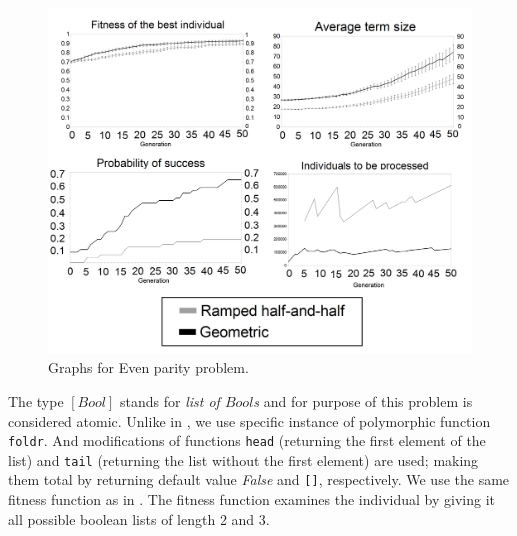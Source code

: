 \documentclass[conference]{IEEEtran}
\begin{document}
\begin{figure}[h!]
  \caption{Graphs for Even parity problem.}
  \centering
    \includegraphics[scale=0.15]{imgs/cec/EP.PNG}
\end{figure}

The type $[Bool]$ stands for \textit{list of $Bool$s} and for purpose of
this problem is considered atomic.
Unlike in \cite{yu01}, we use specific instance of polymorphic 
function \texttt{foldr}. 
And modifications of functions \texttt{head} 
(returning the first element of the list) 
and \texttt{tail} (returning the list without the first element) are used; 
making them total by returning default value \textit{False}
and \texttt{[]}, respectively.
We use the same fitness function as in \cite{yu01}. 
The fitness function examines the individual by giving
it all possible boolean lists of length 2 and 3.
\end{document}

